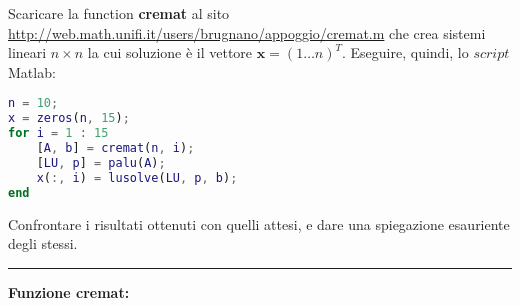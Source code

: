 Scaricare la function \textbf{cremat} al sito
\url{http://web.math.unifi.it/users/brugnano/appoggio/cremat.m}
che crea sistemi lineari $n \times n$ la cui soluzione è il vettore $\textbf{x}=(1 \dots n)^{T}$.
Eseguire, quindi, lo $script$ Matlab:
\begin{lstlisting}[language=Matlab]
n = 10;
x = zeros(n, 15);
for i = 1 : 15
    [A, b] = cremat(n, i);
    [LU, p] = palu(A);
    x(:, i) = lusolve(LU, p, b);
end
\end{lstlisting}
Confrontare i risultati ottenuti con quelli attesi, e dare una spiegazione esauriente degli stessi.

\hspace*{\fill}
\par\noindent\rule{\textwidth}{0.4pt}
\hspace*{\fill}

\begin{minipage}{\textwidth}
	\textbf{Funzione cremat:}

\end{minipage}


